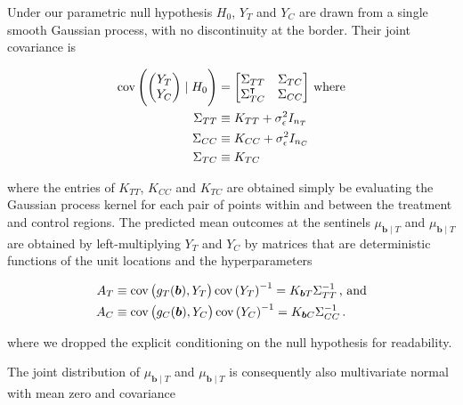 \documentclass[letter]{article}
\DeclareMathOperator{\cov}{{cov}}
\newcommand{\trans}{^{\intercal}}
\newcommand{\sigman}{\sigma_{\epsilon}}
\newcommand{\sentinels}{\bm{b}}
\begin{document}
    	Under our parametric null hypothesis \(H_0\), \(Y_T\) and \(Y_C\) are drawn from a single smooth Gaussian process, with no discontinuity at the border.
Their joint covariance is

\begin{equation}
\begin{aligned}
    \cov \del{\begin{pmatrix}Y_T \\ Y_C\end{pmatrix} \mid H_0 } &= \begin{bmatrix}
                        \Sigma_{TT} & \Sigma_{TC} \\
                        \Sigma\trans_{TC} & \Sigma_{CC}
                    \end{bmatrix}\,\text{where} \\
    \Sigma_{TT} &\equiv K_{TT} + \sigman^2 I_{n_T} \\
    \Sigma_{CC} &\equiv K_{CC} + \sigman^2 I_{n_C} \\
    \Sigma_{TC} &\equiv K_{TC}
\end{aligned}
\end{equation}

where the entries of \(K_{TT}\), \(K_{CC}\) and \(K_{TC}\) are obtained simply be evaluating the Gaussian process kernel for each pair of points within and between the treatment and control regions.
The predicted mean outcomes at the sentinels \(\mu_{\sentinels \mid T}\) and \(\mu_{\sentinels \mid T}\) are obtained by left-multiplying \(Y_T\) and \(Y_C\) by matrices that are deterministic functions of the unit locations and the hyperparameters

\begin{equation}
\begin{split}
    A_T &\equiv \cov\del{g_T(\sentinels), Y_T} \cov\del{Y_T}^{-1} = K_{\sentinels T} \Sigma_{TT}^{-1} \,\text{, and} \\
    A_C &\equiv \cov\del{g_C(\sentinels), Y_C} \cov\del{Y_C}^{-1} = K_{\sentinels C} \Sigma_{CC}^{-1}\,.
\end{split}
\end{equation}

where we dropped the explicit conditioning on the null hypothesis for readability.
    


    	The joint distribution of \(\mu_{\sentinels \mid T}\) and \(\mu_{\sentinels \mid T}\) is consequently also multivariate normal with mean zero and covariance
\end{document}
